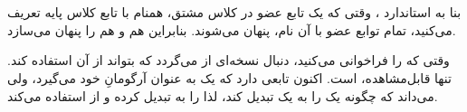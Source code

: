 \section{}
\paragraph{}\label{answer:58}
بنا به استاندارد ، وقتی که یک تابع عضو در کلاس مشتق، همنام با تابع کلاس پایه تعریف می‌کنید، تمام توابع عضو با آن نام، پنهان می‌شوند. بنابراین  هم  و هم  را پنهان می‌سازد.

وقتی که  را فراخوانی می‌کنید،  دنبال نسخه‌ای از  می‌گردد که بتواند از آن استفاده کند. تنها  قابل‌مشاهده،  است.  اکنون تابعی دارد که یک  به عنوان آرگومانِ خود می‌گیرد، ولی می‌داند که چگونه یک  را به یک  تبدیل کند، لذا  را به  تبدیل کرده و از  استفاده می‌کند.

